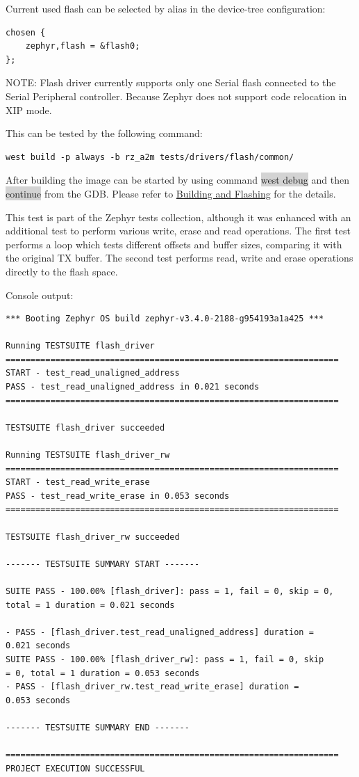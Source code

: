 \documentclass[11pt,a4paper,oneside]{article}
\begin{document}
Current used flash can be selected by alias in the device-tree
configuration:

\begin{lstlisting}
chosen {
    zephyr,flash = &flash0;
};
\end{lstlisting}

NOTE: Flash driver currently supports only one Serial flash connected to
the Serial Peripheral controller. Because Zephyr does not support code
relocation in XIP mode.

This can be tested by the following command:

\begin{lstlisting}
west build -p always -b rz_a2m tests/drivers/flash/common/
\end{lstlisting}

After building the image can be started by using command \colorbox{lightgray}{west debug}
and then \colorbox{lightgray}{continue} from the GDB. Please refer to
\hyperref[building-and-flashing]{Building and Flashing} for the
details.

This test is part of the Zephyr tests collection, although it was
enhanced with an additional test to perform various write, erase and
read operations. The first test performs a loop which tests different
offsets and buffer sizes, comparing it with the original TX buffer. The
second test performs read, write and erase operations directly to the
flash space.

Console output:

\begin{lstlisting}
*** Booting Zephyr OS build zephyr-v3.4.0-2188-g954193a1a425 ***

Running TESTSUITE flash_driver
===================================================================
START - test_read_unaligned_address
PASS - test_read_unaligned_address in 0.021 seconds
===================================================================

TESTSUITE flash_driver succeeded

Running TESTSUITE flash_driver_rw
===================================================================
START - test_read_write_erase
PASS - test_read_write_erase in 0.053 seconds
===================================================================

TESTSUITE flash_driver_rw succeeded

------- TESTSUITE SUMMARY START -------

SUITE PASS - 100.00% [flash_driver]: pass = 1, fail = 0, skip = 0,
total = 1 duration = 0.021 seconds

- PASS - [flash_driver.test_read_unaligned_address] duration =
0.021 seconds
SUITE PASS - 100.00% [flash_driver_rw]: pass = 1, fail = 0, skip
= 0, total = 1 duration = 0.053 seconds
- PASS - [flash_driver_rw.test_read_write_erase] duration =
0.053 seconds

------- TESTSUITE SUMMARY END -------

===================================================================
PROJECT EXECUTION SUCCESSFUL
\end{lstlisting}
\end{document}
